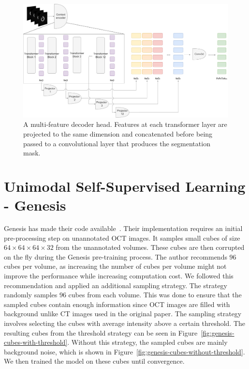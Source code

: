 \documentclass[a4paper,11pt,oneside]{report}
\begin{document}
\begin{figure}[ht]
    \centering
    \includegraphics[width=1.0\linewidth]{figures/fig_implementation_vjepa_multifeat.pdf}
    \caption{A multi-feature decoder head. Features at each transformer layer are projected to the same dimension and concatenated before being passed to a convolutional layer that produces the segmentation mask.}
    \label{fig:vjepa-multi-feature-decoder-head}
\end{figure}

\section{Unimodal Self-Supervised Learning - Genesis}
Genesis has made their code available~\cite{Zhou2021}. Their implementation requires an initial pre-processing step on unannotated OCT images. It samples small cubes of size $64\times 64\times 64\times 32$ from the unannotated volumes. These cubes are then corrupted on the fly during the Genesis pre-training process. The author recommends $96$ cubes per volume, as increasing the number of cubes per volume might not improve the performance while increasing computation cost. We followed this recommendation and applied an additional sampling strategy. The strategy randomly samples $96$ cubes from each volume. This was done to ensure that the sampled cubes contain enough information since OCT images are filled with background unlike CT images used in the original paper. The sampling strategy involves selecting the cubes with average intensity above a certain threshold. The resulting cubes from the threshold strategy can be seen in Figure~\ref{fig:genesis-cubes-with-threshold}. Without this strategy, the sampled cubes are mainly background noise, which is shown in Figure~\ref{fig:genesis-cubes-without-threshold}. We then trained the model on these cubes until convergence.
\end{document}

